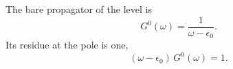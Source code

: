 \documentclass{article}
\begin{document}
The bare propagator of the level is
\begin{equation}
G^0(\omega) = \frac{1}{\omega - \epsilon_0} .
\label{eq:g0}
\end{equation}
Its residue at the pole is one,
\begin{equation}
(\omega-\epsilon_0)\, G^0(\omega) = 1 .
\label{eq:res}
\end{equation}
\end{document}
